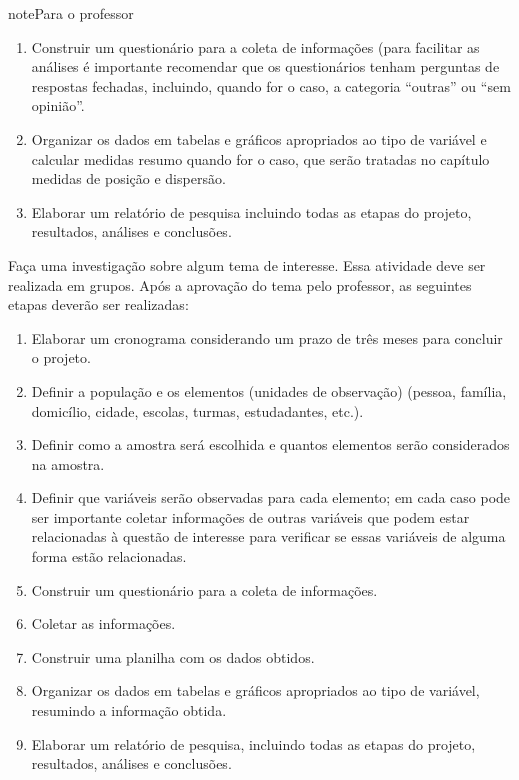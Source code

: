 \begin{sphinxadmonition}{note}{Para o professor}
\begin{enumerate}
\item {} 
Construir um questionário para a coleta de informações (para facilitar as análises é importante recomendar que os questionários tenham perguntas de respostas fechadas, incluindo, quando for o caso, a categoria ``outras'' ou ``sem opinião''.

\item {} 
Organizar os dados em tabelas e gráficos apropriados ao tipo de variável e calcular medidas resumo quando for o caso, que serão tratadas no capítulo medidas de posição e dispersão.

\item {} 
Elaborar um relatório de pesquisa incluindo todas as etapas do projeto, resultados, análises e conclusões.

\end{enumerate}
\end{sphinxadmonition}

Faça uma investigação sobre algum tema de interesse. Essa atividade deve ser realizada em grupos.  Após a aprovação do tema pelo professor, as seguintes etapas deverão ser realizadas:
\begin{enumerate}
\item {} 
Elaborar um cronograma considerando um prazo de três meses para concluir o projeto.

\item {} 
Definir a população e os elementos (unidades de observação) (pessoa, família, domicílio, cidade, escolas, turmas, estudadantes, etc.).

\item {} 
Definir como a amostra será escolhida e quantos elementos serão considerados na amostra.

\item {} 
Definir que variáveis serão observadas para cada elemento; em cada caso pode ser importante coletar informações de outras variáveis que podem estar relacionadas à questão de interesse para verificar se essas variáveis de alguma forma estão relacionadas.

\item {} 
Construir um questionário para a coleta de informações.

\item {} 
Coletar as informações.

\item {} 
Construir uma planilha com os dados obtidos.

\item {} 
Organizar os dados em tabelas e gráficos apropriados ao tipo de variável, resumindo a informação obtida.

\item {} 
Elaborar um relatório de pesquisa, incluindo todas as etapas do projeto, resultados, análises e conclusões.

\end{enumerate}


